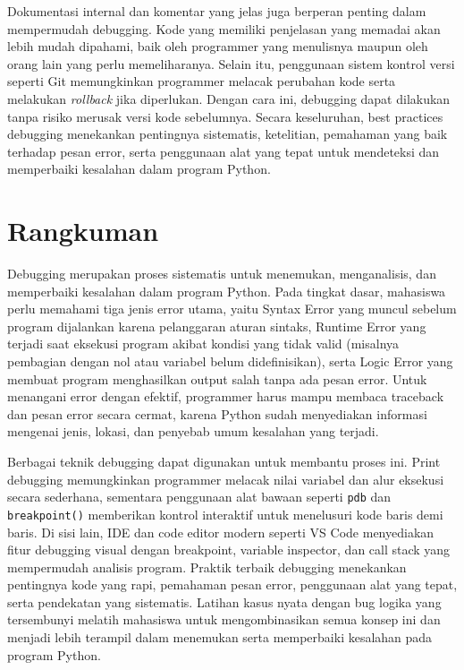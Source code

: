 Dokumentasi internal dan komentar yang jelas juga berperan penting dalam mempermudah debugging. Kode yang memiliki penjelasan yang memadai akan lebih mudah dipahami, baik oleh programmer yang menulisnya maupun oleh orang lain yang perlu memeliharanya. Selain itu, penggunaan sistem kontrol versi seperti Git memungkinkan programmer melacak perubahan kode serta melakukan \textit{rollback} jika diperlukan. Dengan cara ini, debugging dapat dilakukan tanpa risiko merusak versi kode sebelumnya. Secara keseluruhan, best practices debugging menekankan pentingnya sistematis, ketelitian, pemahaman yang baik terhadap pesan error, serta penggunaan alat yang tepat untuk mendeteksi dan memperbaiki kesalahan dalam program Python.

\section{Rangkuman}

Debugging merupakan proses sistematis untuk menemukan, menganalisis, dan memperbaiki kesalahan dalam program Python. Pada tingkat dasar, mahasiswa perlu memahami tiga jenis error utama, yaitu Syntax Error yang muncul sebelum program dijalankan karena pelanggaran aturan sintaks, Runtime Error yang terjadi saat eksekusi program akibat kondisi yang tidak valid (misalnya pembagian dengan nol atau variabel belum didefinisikan), serta Logic Error yang membuat program menghasilkan output salah tanpa ada pesan error. Untuk menangani error dengan efektif, programmer harus mampu membaca traceback dan pesan error secara cermat, karena Python sudah menyediakan informasi mengenai jenis, lokasi, dan penyebab umum kesalahan yang terjadi.

Berbagai teknik debugging dapat digunakan untuk membantu proses ini. Print debugging memungkinkan programmer melacak nilai variabel dan alur eksekusi secara sederhana, sementara penggunaan alat bawaan seperti \texttt{pdb} dan \texttt{breakpoint()} memberikan kontrol interaktif untuk menelusuri kode baris demi baris. Di sisi lain, IDE dan code editor modern seperti VS Code menyediakan fitur debugging visual dengan breakpoint, variable inspector, dan call stack yang mempermudah analisis program. Praktik terbaik debugging menekankan pentingnya kode yang rapi, pemahaman pesan error, penggunaan alat yang tepat, serta pendekatan yang sistematis. Latihan kasus nyata dengan bug logika yang tersembunyi melatih mahasiswa untuk mengombinasikan semua konsep ini dan menjadi lebih terampil dalam menemukan serta memperbaiki kesalahan pada program Python.


